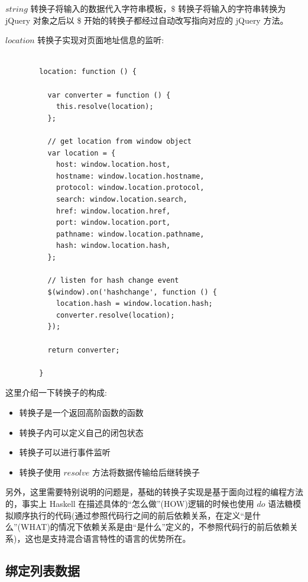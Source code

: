 $string$ 转换子将输入的数据代入字符串模板，$\$$ 转换子将输入的字符串转换为 jQuery 对象之后以 \$ 开始的转换子都经过自动改写指向对应的 jQuery 方法。

$location$ 转换子实现对页面地址信息的监听:

\begin{verbatim}

        location: function () {

          var converter = function () {
            this.resolve(location);
          };

          // get location from window object
          var location = {
            host: window.location.host,
            hostname: window.location.hostname,
            protocol: window.location.protocol,
            search: window.location.search,
            href: window.location.href,
            port: window.location.port,
            pathname: window.location.pathname,
            hash: window.location.hash,
          };

          // listen for hash change event
          $(window).on('hashchange', function () {
            location.hash = window.location.hash;
            converter.resolve(location);
          });

          return converter;

        }

\end{verbatim}

这里介绍一下转换子的构成:

\begin{itemize}
  \item 转换子是一个返回高阶函数的函数
  \item 转换子内可以定义自己的闭包状态
  \item 转换子可以进行事件监听
  \item 转换子使用 $resolve$ 方法将数据传输给后继转换子
\end{itemize}

另外，这里需要特别说明的问题是，基础的转换子实现是基于面向过程的编程方法的，事实上 Haskell 在描述具体的“怎么做”(HOW)逻辑的时候也使用 $do$ 语法糖模拟顺序执行的代码(通过参照代码行之间的前后依赖关系，在定义“是什么”(WHAT)的情况下依赖关系是由“是什么”定义的，不参照代码行的前后依赖关系)，这也是支持混合语言特性的语言的优势所在。

\subsection{绑定列表数据}

